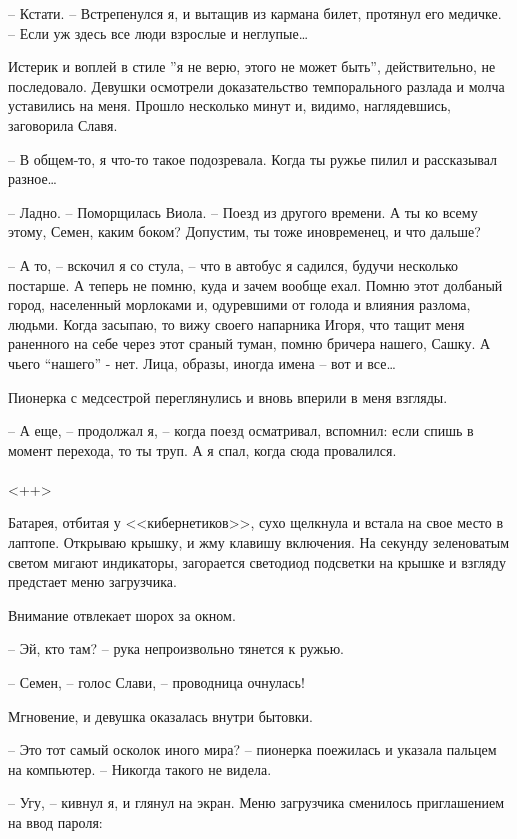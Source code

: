\documentclass[a4paper]{book}
\begin{document}
-- Кстати. -- Встрепенулся я, и вытащив из кармана билет, протянул его медичке. -- Если уж здесь все люди взрослые и неглупые\ldots

Истерик и воплей в стиле ''я не верю, этого не может быть'', действительно, не последовало. Девушки осмотрели доказательство темпорального разлада и молча уставились на меня. Прошло несколько минут и, видимо, наглядевшись, заговорила Славя. 

-- В общем-то, я что-то такое подозревала. Когда ты ружье пилил и рассказывал разное\ldots

-- Ладно. -- Поморщилась Виола. -- Поезд из другого времени. А ты ко всему этому, Семен, каким боком? Допустим, ты тоже иновременец, и что дальше?

-- А то, -- вскочил я со стула, -- что в автобус я садился, будучи несколько постарше. А теперь не помню, куда и зачем вообще ехал. Помню этот долбаный город, населенный морлоками и, одуревшими от голода и влияния разлома, людьми. Когда засыпаю, то вижу своего напарника Игоря, что тащит меня раненного на себе через этот сраный туман, помню бричера нашего, Сашку. А чьего ``нашего'' - нет. Лица, образы, иногда имена -- вот и все\ldots

Пионерка с медсестрой переглянулись и вновь вперили в меня взгляды. 

-- А еще, -- продолжал я, -- когда поезд осматривал, вспомнил: если спишь в момент перехода, то ты труп. А я спал, когда сюда провалился.

\paragraph{}<++>

Батарея, отбитая у <<кибернетиков>>, сухо щелкнула и встала на свое место в лаптопе. Открываю крышку, и жму клавишу включения. На секунду зеленоватым светом мигают индикаторы, загорается светодиод подсветки на крышке и взгляду предстает меню загрузчика.

Внимание отвлекает шорох за окном. 

-- Эй, кто там? -- рука непроизвольно тянется к ружью.

-- Семен, -- голос Слави, -- проводница очнулась!

Мгновение, и девушка оказалась внутри бытовки. 

-- Это тот самый осколок иного мира? -- пионерка поежилась и указала пальцем на компьютер. -- Никогда такого не видела.

-- Угу, -- кивнул я, и глянул на экран. Меню загрузчика сменилось приглашением на ввод пароля:
\end{document}
